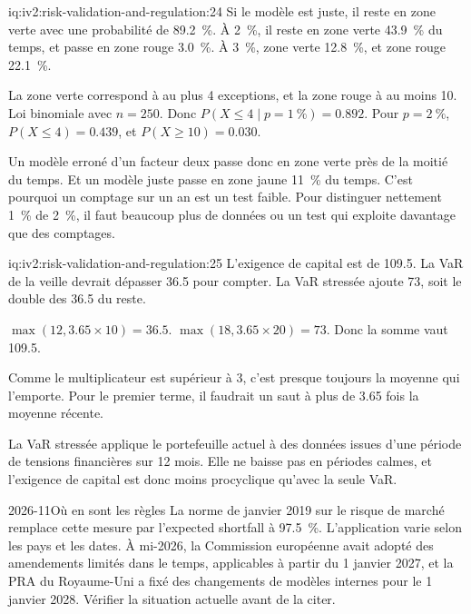 \begin{solution}{iq:iv2:risk-validation-and-regulation:24}
Si le modèle est juste, il reste en zone verte avec une probabilité de 89.2~\%. À 2~\%, il reste en zone verte 43.9~\% du temps, et passe en zone rouge 3.0~\%. À 3~\%, zone verte 12.8~\%, et zone rouge 22.1~\%.

La zone verte correspond à au plus 4 exceptions, et la zone rouge à au moins 10. Loi binomiale avec $n = 250$. Donc $P(X \le 4 \mid p = 1~\%) = 0.892$. Pour $p = 2~\%$, $P(X \le 4) = 0.439$, et $P(X \ge 10) = 0.030$.

Un modèle erroné d'un facteur deux passe donc en zone verte près de la moitié du temps. Et un modèle juste passe en zone jaune 11~\% du temps. C'est pourquoi un comptage sur un an est un test faible. Pour distinguer nettement 1~\% de 2~\%, il faut beaucoup plus de données ou un test qui exploite davantage que des comptages.

\end{solution}

\begin{solution}{iq:iv2:risk-validation-and-regulation:25}
L'exigence de capital est de 109.5. La VaR de la veille devrait dépasser 36.5 pour compter. La VaR stressée ajoute 73, soit le double des 36.5 du reste.

$\max(12, 3.65 \times 10) = 36.5$. $\max(18, 3.65 \times 20) = 73$. Donc la somme vaut 109.5.

Comme le multiplicateur est supérieur à 3, c'est presque toujours la moyenne qui l'emporte. Pour le premier terme, il faudrait un saut à plus de 3.65 fois la moyenne récente.

La VaR stressée applique le portefeuille actuel à des données issues d'une période de tensions financières sur 12 mois. Elle ne baisse pas en périodes calmes, et l'exigence de capital est donc moins procyclique qu'avec la seule VaR.

\begin{dated}{2026-11}{Où en sont les règles}\label{dat:iv2:risk-validation-and-regulation:frtb}
La norme de janvier 2019 sur le risque de marché remplace cette mesure par l'expected shortfall à 97.5~\%. L'application varie selon les pays et les dates. À mi-2026, la Commission européenne avait adopté des amendements limités dans le temps, applicables à partir du 1 janvier 2027, et la PRA du Royaume-Uni a fixé des changements de modèles internes pour le 1 janvier 2028. Vérifier la situation actuelle avant de la citer.
\end{dated}

\end{solution}

